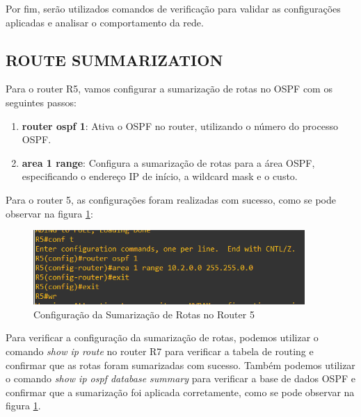 \documentclass[11pt,english, openright, oneside]{book}
\begin{document}
Por fim, serão utilizados comandos de verificação para validar as configurações aplicadas e analisar o comportamento da rede.

\subsection{ROUTE SUMMARIZATION}
\vspace{0.2cm}

Para o router R5, vamos configurar a sumarização de rotas no OSPF com os seguintes passos:
\vspace{0.2cm}

\begin{enumerate}
  \item \textbf{router ospf 1}: Ativa o OSPF no router, utilizando o número do processo OSPF.
  \item \textbf{area 1 range}: Configura a sumarização de rotas para a área OSPF, especificando o endereço IP de início, a wildcard mask e o custo.
\end{enumerate}
\vspace{0.2cm}

Para o router 5, as configurações foram realizadas com sucesso, como se pode observar na figura \ref{fig:config42}:
\vspace{0.2cm}

\begin{figure}[H]
  \centering
  \includegraphics[width=0.92\textwidth]{imagens/Tarefa5/24.summarization_R5.png}
  \caption{Configuração da Sumarização de Rotas no Router 5}
  \label{fig:config42}
\end{figure}
\vspace{0.2cm}

\newpage
\par Para verificar a configuração da sumarização de rotas, podemos utilizar o comando \textit{show ip route} no router R7 para verificar a tabela de routing e confirmar que as rotas foram sumarizadas com sucesso. Também podemos utilizar o comando \textit{show ip ospf database summary}
para verificar a base de dados OSPF e confirmar que a sumarização foi aplicada corretamente, como se pode observar na figura \ref{fig:config42}.
\vspace{0.2cm}
\end{document}
